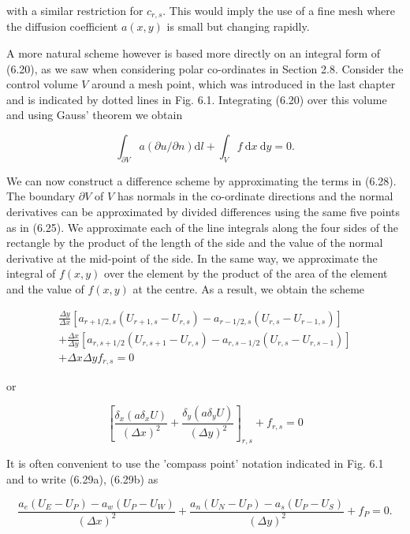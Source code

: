 \documentclass[10pt]{article}
\begin{document}
with a similar restriction for \(c_{r, s}\). This would imply the use of a fine mesh where the diffusion coefficient \(a(x, y)\) is small but changing rapidly.

A more natural scheme however is based more directly on an integral form of (6.20), as we saw when considering polar co-ordinates in Section 2.8. Consider the control volume \(V\) around a mesh point, which was introduced in the last chapter and is indicated by dotted lines in Fig. 6.1. Integrating (6.20) over this volume and using Gauss' theorem we obtain

\[
\int_{\partial V} a(\partial u / \partial n) \mathrm{d} l+\int_{V} f \mathrm{~d} x \mathrm{~d} y=0 .
\]

We can now construct a difference scheme by approximating the terms in (6.28). The boundary \(\partial V\) of \(V\) has normals in the co-ordinate directions and the normal derivatives can be approximated by divided differences using the same five points as in (6.25). We approximate each of the line integrals along the four sides of the rectangle by the product of the length of the side and the value of the normal derivative at the mid-point of the side. In the same way, we approximate the integral of \(f(x, y)\) over the element by the product of the area of the element and the value of \(f(x, y)\) at the centre. As a result, we obtain the scheme

\[
\begin{gathered}
\frac{\Delta y}{\Delta x}\left[a_{r+1 / 2, s}\left(U_{r+1, s}-U_{r, s}\right)-a_{r-1 / 2, s}\left(U_{r, s}-U_{r-1, s}\right)\right] \\
+\frac{\Delta x}{\Delta y}\left[a_{r, s+1 / 2}\left(U_{r, s+1}-U_{r, s}\right)-a_{r, s-1 / 2}\left(U_{r, s}-U_{r, s-1}\right)\right] \\
+\Delta x \Delta y f_{r, s}=0
\end{gathered}
\]

or

\[
\left[\frac{\delta_{x}\left(a \delta_{x} U\right)}{(\Delta x)^{2}}+\frac{\delta_{y}\left(a \delta_{y} U\right)}{(\Delta y)^{2}}\right]_{r, s}+f_{r, s}=0
\]

It is often convenient to use the 'compass point' notation indicated in Fig. 6.1 and to write (6.29a), (6.29b) as

\[
\frac{a_{e}\left(U_{E}-U_{P}\right)-a_{w}\left(U_{P}-U_{W}\right)}{(\Delta x)^{2}}+\frac{a_{n}\left(U_{N}-U_{P}\right)-a_{s}\left(U_{P}-U_{S}\right)}{(\Delta y)^{2}}+f_{P}=0 .
\]
\end{document}
